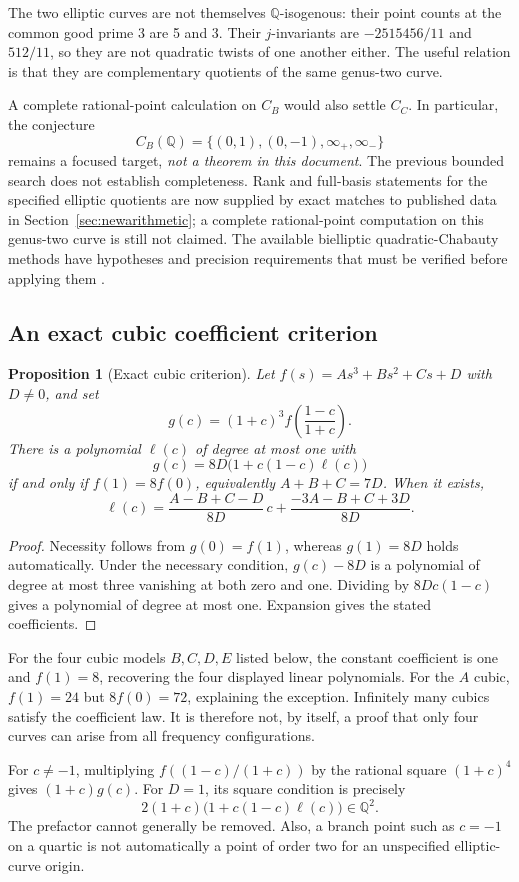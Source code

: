 \documentclass[11pt,letterpaper]{article}
\newtheorem{proposition}[theorem]{Proposition}
\theoremstyle{definition}\newtheorem{definition}[theorem]{Definition}
\theoremstyle{remark}\newtheorem{remark}[theorem]{Remark}
\newcommand{\Q}{\mathbb Q}\newcommand{\Z}{\mathbb Z}\newcommand{\R}{\mathbb R}
\begin{document}
The two elliptic curves are not themselves $\Q$-isogenous: their point counts at the common good prime 3 are 5 and 3. Their $j$-invariants are $-2515456/11$ and $512/11$, so they are not quadratic twists of one another either. The useful relation is that they are complementary quotients of the same genus-two curve.

A complete rational-point calculation on $C_B$ would also settle $C_C$. In particular, the conjecture
\[
C_B(\Q)=\{(0,1),(0,-1),\infty_+,\infty_-\}
\]
remains a focused target, \emph{not a theorem in this document}. The previous bounded search does not establish completeness. Rank and full-basis statements for the specified elliptic quotients are now supplied by exact matches to published data in Section~\ref{sec:newarithmetic}; a complete rational-point computation on this genus-two curve is still not claimed. The available bielliptic quadratic-Chabauty methods have hypotheses and precision requirements that must be verified before applying them \cite{BP}.

\subsection{An exact cubic coefficient criterion}
\begin{proposition}[Exact cubic criterion]
Let $f(s)=As^3+Bs^2+Cs+D$ with $D\ne0$, and set
\[
g(c)=(1+c)^3 f\left(\frac{1-c}{1+c}\right).
\]
There is a polynomial $\ell(c)$ of degree at most one with
\[
g(c)=8D\bigl(1+c(1-c)\ell(c)\bigr)
\]
if and only if $f(1)=8f(0)$, equivalently $A+B+C=7D$. When it exists,
\[
\ell(c)=\frac{A-B+C-D}{8D}\,c+
        \frac{-3A-B+C+3D}{8D}.
\]
\end{proposition}
\begin{proof}
Necessity follows from $g(0)=f(1)$, whereas $g(1)=8D$ holds automatically. Under the necessary condition, $g(c)-8D$ is a polynomial of degree at most three vanishing at both zero and one. Dividing by $8Dc(1-c)$ gives a polynomial of degree at most one. Expansion gives the stated coefficients.
\end{proof}
For the four cubic models $B,C,D,E$ listed below, the constant coefficient is one and $f(1)=8$, recovering the four displayed linear polynomials. For the $A$ cubic, $f(1)=24$ but $8f(0)=72$, explaining the exception. Infinitely many cubics satisfy the coefficient law. It is therefore not, by itself, a proof that only four curves can arise from all frequency configurations.

For $c\ne-1$, multiplying $f((1-c)/(1+c))$ by the rational square $(1+c)^4$ gives $(1+c)g(c)$. For $D=1$, its square condition is precisely
\[
2(1+c)\bigl(1+c(1-c)\ell(c)\bigr)\in\Q^2.
\]
The prefactor cannot generally be removed. Also, a branch point such as $c=-1$ on a quartic is not automatically a point of order two for an unspecified elliptic-curve origin.
\end{document}

